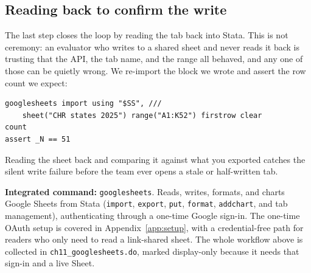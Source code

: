 \documentclass[
    a4paper,
    fontsize=10pt,
    twoside=true,
    numbers=noenddot,
]{kaobook}
\begin{document}
\subsection{Reading back to confirm the write}
The last step closes the loop by reading the tab back into Stata. This is not ceremony: an evaluator who writes to a shared sheet and never reads it back is trusting that the API, the tab name, and the range all behaved, and any one of those can be quietly wrong. We re-import the block we wrote and assert the row count we expect:
{\footnotesize
\begin{verbatim}
googlesheets import using "$SS", ///
    sheet("CHR states 2025") range("A1:K52") firstrow clear
count
assert _N == 51
\end{verbatim}
}
Reading the sheet back and comparing it against what you exported catches the silent write failure before the team ever opens a stale or half-written tab.

\begin{kaobox}[frametitle=Package Integration: \texttt{googlesheets}]
\textbf{Integrated command:} \texttt{googlesheets}. Reads, writes, formats, and charts Google Sheets from Stata (\texttt{import}, \texttt{export}, \texttt{put}, \texttt{format}, \texttt{addchart}, and tab management), authenticating through a one-time Google sign-in. The one-time OAuth setup is covered in Appendix~\ref{app:setup}, with a credential-free path for readers who only need to read a link-shared sheet. The whole workflow above is collected in \texttt{ch11\_googlesheets.do}, marked display-only because it needs that sign-in and a live Sheet.
\end{kaobox}
\end{document}
